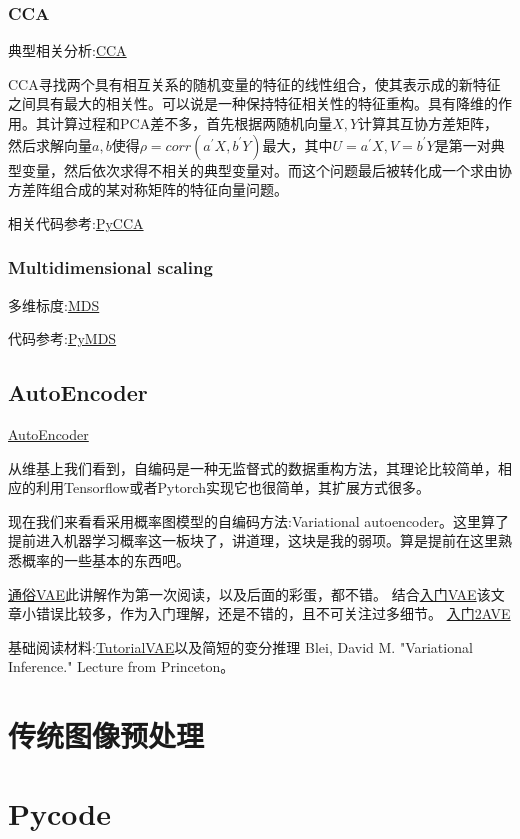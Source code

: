   \subsubsection*{CCA}
  \label{subsec:CCA}
  典型相关分析:\href{https://en.wikipedia.org/wiki/Canonical_correlation}{CCA}

  CCA寻找两个具有相互关系的随机变量的特征的线性组合，使其表示成的新特征之间具有最大的相关性。可以说是一种保持特征相关性的特征重构。具有降维的作用。其计算过程和PCA差不多，首先根据两随机向量$X, Y$计算其互协方差矩阵，然后求解向量$a, b$使得$\rho = corr(a^{'}X, b^{'}Y)$最大，其中$U = a^{'}X, V = b^{'}Y$是第一对典型变量，然后依次求得不相关的典型变量对。而这个问题最后被转化成一个求由协方差阵组合成的某对称矩阵的特征向量问题。

  相关代码参考:\href{http://scikit-learn.org/stable/modules/cross_decomposition.html}{PyCCA}

  
  \subsubsection*{Multidimensional scaling}
  \label{subsec:MDS}
  多维标度:\href{https://en.wikipedia.org/wiki/Multidimensional_scaling}{MDS}

  代码参考:\href{http://scikit-learn.org/stable/modules/generated/sklearn.manifold.MDS.html}{PyMDS}

\subsection*{AutoEncoder}
\label{subsec:AutoEncoder}
\href{https://en.wikipedia.org/wiki/Autoencoder}{AutoEncoder}

从维基上我们看到，自编码是一种无监督式的数据重构方法，其理论比较简单，相应的利用Tensorflow或者Pytorch实现它也很简单，其扩展方式很多。

现在我们来看看采用概率图模型的自编码方法:Variational autoencoder。这里算了提前进入机器学习概率这一板块了，讲道理，这块是我的弱项。算是提前在这里熟悉概率的一些基本的东西吧。

\href{http://www.cnblogs.com/huangshiyu13/p/6209016.html}{通俗VAE}此讲解作为第一次阅读，以及后面的彩蛋，都不错。
结合\href{http://blog.csdn.net/jackytintin/article/details/53641885}{入门VAE}该文章小错误比较多，作为入门理解，还是不错的，且不可关注过多细节。
\href{https://sherlockliao.github.io/2017/06/24/vae/}{入门2AVE}

基础阅读材料:\href{https://arxiv.org/abs/1606.05908}{TutorialVAE}以及简短的变分推理
Blei, David M. "Variational Inference." Lecture from Princeton。


\section*{传统图像预处理}
\label{subsec:troditionarycvprocess}


\section*{Pycode}

\endinput


